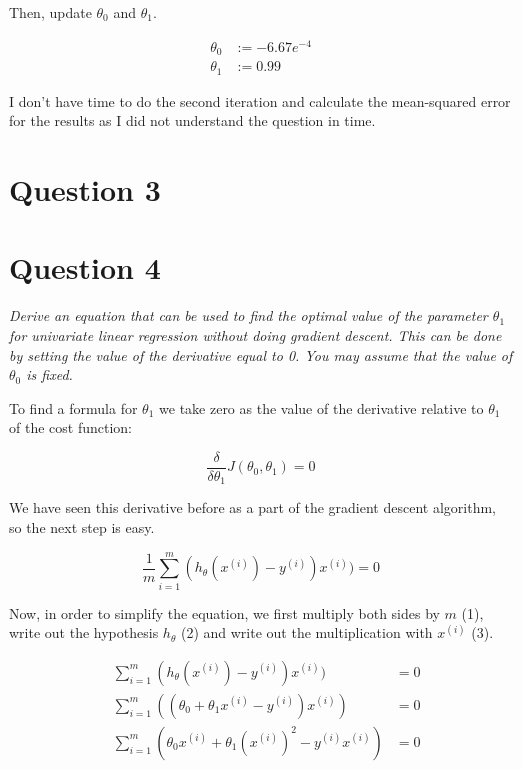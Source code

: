 \documentclass[12pt, a4paper]{article}
\begin{document}
		Then, update $\theta_0$ and $\theta_1$.
		
		\begin{align*}
		\theta_0 &:= -6.67e^{-4}\\
		\theta_1&:=0.99
		\end{align*}

I don't have time to do the second iteration and calculate the mean-squared error for the results as I did not understand the question in time.
	

\pagebreak

\section{Question 3}

\pagebreak

\section{Question 4}
\textit{Derive an equation that can be used to find the optimal value of the parameter $\theta_1$ for
univariate linear regression without doing gradient descent. This can be done by setting the value of the
derivative equal to 0. You may assume that the value of $\theta_0$ is fixed.}

	To find a formula for $\theta_1$ we take zero as the value of the derivative relative to $\theta_1$ of the cost function: 
	
	\begin{equation*}
	\frac{\delta}{\delta\theta_1}J(\theta_0, \theta_1) = 0
	\end{equation*}
	
	We have seen this derivative before as a part of the gradient descent algorithm, so the next step is easy. 
	
	\begin{equation*}
	 \frac{1}{m} \sum\limits_{i=1}^m (h _{\theta} (x ^{(i)}) - y ^{(i)})x^{(i)}) = 0
	\end{equation*}
	
	Now, in order to simplify the equation, we first multiply both sides by $m$ (1), write out the hypothesis $h_\theta$ (2) and write out the multiplication with $x^{(i)}$ (3).
	
	\begin{align}
	&\sum\limits_{i=1}^m(h_\theta(x^{(i)})-y^{(i)})x^{(i)}) &= 0\\
	&\sum\limits_{i=1}^m((\theta_0+\theta_1x^{(i)} - y^{(i)})x^{(i)}) &= 0\\
	&\sum\limits_{i=1}^m(\theta_0x^{(i)} + \theta_1(x^{(i)})^2 - y^{(i)}x^{(i)}) &= 0
	\end{align}
	
\end{document}
